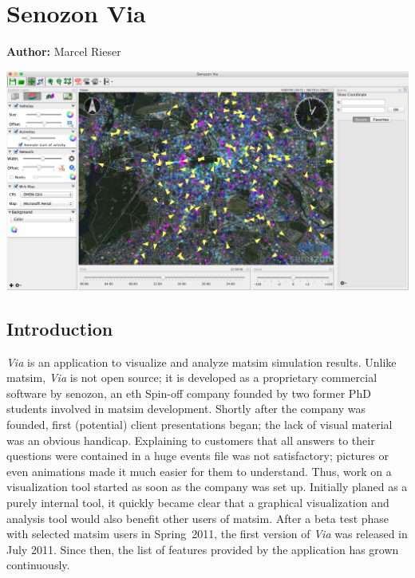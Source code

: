 \chapter{Senozon Via}
\label{ch:via}

\hfill \textbf{Author:} Marcel Rieser

\begin{center} \includegraphics[width=1.\textwidth, angle=0]{extending/figures/via/title.png} \end{center}



\def\Via{\emph{Via}}
\section{Introduction}
\Via{} is an application to visualize and analyze \gls{matsim} simulation results.
Unlike \gls{matsim}, \Via{} is not open source; it is developed as a proprietary commercial software
by \gls{senozon}, an \gls{eth } Spin-off company founded by two former PhD students
involved in \gls{matsim} development. Shortly after the company was founded, 
first (potential) client presentations began; the lack of visual material
was an obvious handicap. Explaining to customers that all answers to their questions were
contained in a huge events file was not satisfactory; pictures or
even animations made it much easier for them to understand. Thus,
 work on a visualization tool started as soon as the company
was set up. Initially planed as a purely internal tool, it quickly became clear
that a graphical visualization and analysis tool would also benefit 
other users of \gls{matsim}. After a beta test phase with selected \gls{matsim}
users in Spring~2011, the first version of \Via{} was released in July
2011. Since then, the list of features provided by the application has grown
continuously.

